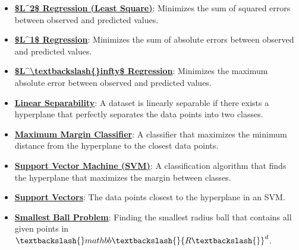 \documentclass{article}%
\begin{document}
\begin{itemize}[leftmargin=*]%
\item \href{https://www.math.purdue.edu/~yipn/421/2024-10-22-Regression.pdf#page=4}{\textbf{\$L\^{}2\$ Regression (Least Square)}}: Minimizes the sum of squared errors between observed and predicted values.%
\item \href{https://www.math.purdue.edu/~yipn/421/2024-10-22-Regression.pdf#page=5}{\textbf{\$L\^{}1\$ Regression}}: Minimizes the sum of absolute errors between observed and predicted values.%
\item \href{https://www.math.purdue.edu/~yipn/421/2024-10-22-Regression.pdf#page=6}{\textbf{\$L\^{}\textbackslash{}textbackslash\{\}infty\$ Regression}}: Minimizes the maximum absolute error between observed and predicted values.%
\item \href{https://www.math.purdue.edu/~yipn/421/2024-10-22-Regression.pdf#page=8}{\textbf{Linear Separability}}: A dataset is linearly separable if there exists a hyperplane that perfectly separates the data points into two classes.%
\item \href{https://www.math.purdue.edu/~yipn/421/2024-10-22-Regression.pdf#page=9}{\textbf{Maximum Margin Classifier}}: A classifier that maximizes the minimum distance from the hyperplane to the closest data points.%
\item \href{https://www.math.purdue.edu/~yipn/421/2024-10-22-Regression.pdf#page=10}{\textbf{Support Vector Machine (SVM)}}: A classification algorithm that finds the hyperplane that maximizes the margin between classes.%
\item \href{https://www.math.purdue.edu/~yipn/421/2024-10-22-Regression.pdf#page=10}{\textbf{Support Vectors}}: The data points closest to the hyperplane in an SVM.%
\item \href{https://www.math.purdue.edu/~yipn/421/2024-10-22-Regression.pdf#page=22}{\textbf{Smallest Ball Problem}}: Finding the smallest radius ball that contains all given points in $\textbackslash{}mathbb\textbackslash{}{R\textbackslash{}}^d$.%
\end{itemize}%
\end{document}
